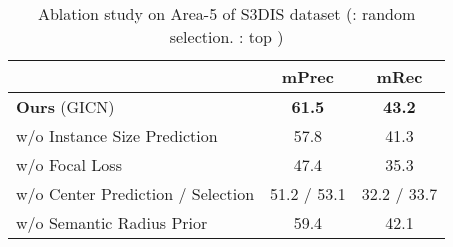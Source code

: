 \documentclass[runningheads]{llncs}
\begin{document}
\begin{table}[tbh]
\caption{Ablation study on Area-5 of S3DIS dataset (: random selection. : top )}
\label{table:ablation_study}
\vspace{-5mm}
\begin{center}
\centering
\begin{tabular}{|l|@{\quad}c@{\quad}c@{\quad}|} 
\hline
& mPrec & mRec  \\ 
\hline
{\bf Ours} (GICN)                          & {\bf 61.5}  &{\bf 43.2}   \\
w/o Instance Size Prediction      & 57.8  &  41.3  \\
w/o Focal Loss                      & 47.4  & 35.3  \\
w/o Center Prediction / Selection  & 51.2 / 53.1  & 32.2 /  33.7  \\
w/o Semantic Radius Prior  & 59.4  & 42.1    \\
\hline
\end{tabular}
\end{center}
\end{table}
\end{document}
